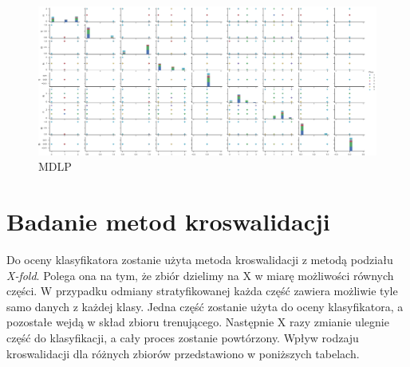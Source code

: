 \documentclass[12pt,a4paper]{article}
\begin{document}
\begin{figure}[H]
\centering
\includegraphics[width=1\textwidth]{dsGlassMDLP.png}
\caption{MDLP}
\end{figure}

\section{Badanie metod kroswalidacji}
Do oceny klasyfikatora zostanie użyta metoda kroswalidacji z metodą podziału \emph{X-fold}. Polega ona na tym, że zbiór dzielimy na X w miarę możliwości równych części. W przypadku odmiany stratyfikowanej każda część zawiera możliwie tyle samo danych z każdej klasy. Jedna część zostanie użyta do oceny klasyfikatora, a pozostałe wejdą w skład zbioru trenującego. Następnie X razy zmianie ulegnie część do klasyfikacji, a cały proces zostanie powtórzony. 
Wpływ rodzaju kroswalidacji dla różnych zbiorów przedstawiono w poniższych tabelach. 
\end{document}
